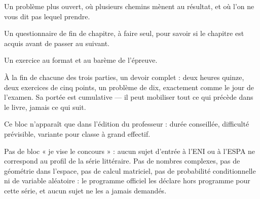\begin{jecherche}
Un problème plus ouvert, où plusieurs chemins mènent au résultat, et où l'on
ne vous dit pas lequel prendre.
\end{jecherche}

\begin{jemeteste}
Un questionnaire de fin de chapitre, à faire seul, pour savoir si le chapitre
est acquis avant de passer au suivant.
\end{jemeteste}

\begin{commeaubac}
Un exercice au format et au barème de l'épreuve.
\end{commeaubac}

\begin{devoirsurveille}
À la fin de chacune des trois parties, un devoir complet : deux heures
quinze, deux exercices de cinq points, un problème de dix, exactement comme
le jour de l'examen. Sa portée est cumulative — il peut mobiliser tout ce qui
précède dans le livre, jamais ce qui suit.
\end{devoirsurveille}

\begin{notepourlaclasse}
Ce bloc n'apparaît que dans l'édition du professeur : durée conseillée,
difficulté prévisible, variante pour classe à grand effectif.
\end{notepourlaclasse}

\vspace{0.6em}

\begin{remarque}
Pas de bloc « je vise le concours » : aucun sujet d'entrée à l'ENI ou à
l'ESPA ne correspond au profil de la série littéraire. Pas de nombres
complexes, pas de géométrie dans l'espace, pas de calcul matriciel, pas de
probabilité conditionnelle ni de variable aléatoire : le programme officiel
les déclare hors programme pour cette série, et aucun sujet ne les a jamais
demandés.
\end{remarque}
